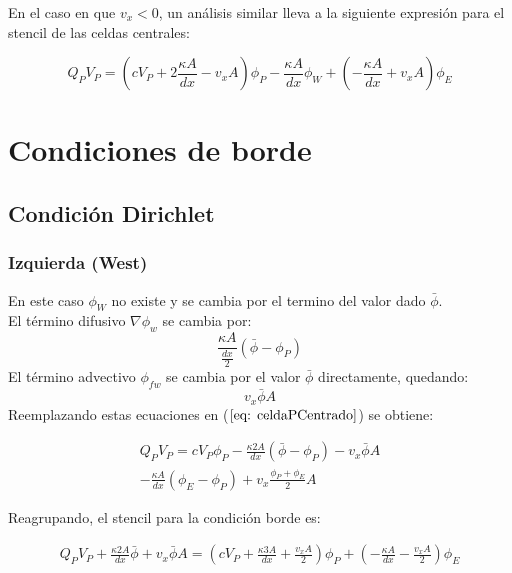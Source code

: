 \documentclass{article}
\begin{document}
		En el caso en que $v_x < 0$, un análisis similar lleva a la siguiente expresión para el stencil de las celdas centrales:

		\begin{equation}
			Q_P V_P = \left( c V_P + 2 \frac{\kappa A}{dx} - v_x A \right) \phi_P
			-\frac{\kappa A}{dx} \phi_W
			+ \left( -\frac{\kappa A}{dx} + v_x A \right)  \phi_E
			\label{eq: stencilCentralUpwind2}
		\end{equation}

\section{Condiciones de borde}
    \subsection{Condición Dirichlet} 
    \subsubsection{Izquierda (West)}
        En este caso $\phi_W$ no existe y se cambia por el termino del valor dado $\bar{\phi}$. \\
        El término difusivo $\nabla \phi_w$ se cambia por:
        \begin{equation*}
        \frac{\kappa A}{\frac{dx}{2}} \left( \bar{\phi} - \phi_P \right)
        \end{equation*}{}
        El término advectivo $\phi_{fw}$ se cambia por el valor $\bar{\phi}$ directamente, quedando:
        \begin{equation*}
            v_x \bar{\phi} A
        \end{equation*}
        Reemplazando estas ecuaciones en ($\ref{eq: celdaPCentrado}$) se obtiene:
        
        \begin{multline*}
    	    Q_P V_P = c  V_P \phi_P - \frac{\kappa 2 A}{dx} \left( \bar{\phi} - \phi_P \right) - v_x \bar{\phi} A \\ 
    	        - \frac{\kappa A}{dx} \left( \phi_E - \phi_P \right) + v_x \frac{\phi_P +  \phi_E}{2} A
        \end{multline*}
        
        Reagrupando, el stencil para la condición borde es:
        
        \begin{multline}
    	    Q_P V_P + \frac{\kappa 2 A}{dx} \bar{\phi} + v_x \bar{\phi} A = (c  V_P  + \frac{\kappa 3 A}{dx} + \frac{v_x A}{2}) \phi_P 
    	    + ( -\frac{\kappa A}{dx} - \frac{v_x A}{2}) \phi_E
    	    \label{eq:stencilDirW}
        \end{multline}
\end{document}
